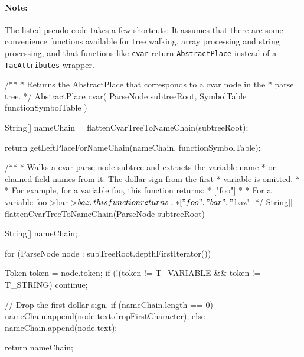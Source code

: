 \paragraph{Note:} The listed pseudo-code takes a few shortcuts: It assumes that there are some convenience functions available for tree walking, array processing and string processing, and that functions like \texttt{cvar} return \texttt{AbstractPlace} instead of a \texttt{TacAttributes} wrapper.

\begin{javacode}
/**
 * Returns the AbstractPlace that corresponds to a cvar node in the
 * parse tree.
 */
AbstractPlace cvar(
  ParseNode subtreeRoot, SymbolTable functionSymbolTable
) {
  String[] nameChain = flattenCvarTreeToNameChain(subtreeRoot);

  return getLeftPlaceForNameChain(nameChain, functionSymbolTable);
}
\end{javacode}

\begin{javacode}
/**
 * Walks a cvar parse node subtree and extracts the variable name
 * or chained field names from it. The dollar sign from the first
 * variable is omitted.
 *
 * For example, for a variable foo, this function returns:
 * ["foo"]
 *
 * For a variable foo->bar->$baz, this function returns:
 * ["foo", "bar", "$baz"]
 */
String[] flattenCvarTreeToNameChain(ParseNode subtreeRoot) {
  String[] nameChain;

  for (ParseNode node : subTreeRoot.depthFirstIterator()) {
    Token token = node.token;
    if (!(token != T_VARIABLE && token != T_STRING) {
      continue;
    }

    // Drop the first dollar sign.
    if (nameChain.length == 0) {
      nameChain.append(node.text.dropFirstCharacter);
    } else {
      nameChain.append(node.text);
    }
  }

  return nameChain;
}
\end{javacode}

